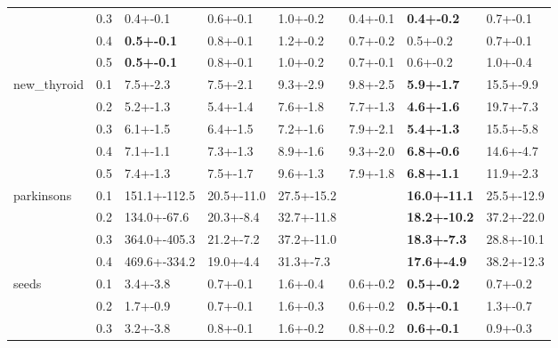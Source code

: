 \begin{tabular}{llllllll}
     & 0.3 &           0.4+-0.1 &                0.6+-0.1 &        1.0+-0.2 &        0.4+-0.1 &        \textbf{0.4+-0.2} &        0.7+-0.1 \\
     & 0.4 &  \textbf{0.5+-0.1} &                0.8+-0.1 &        1.2+-0.2 &        0.7+-0.2 &                 0.5+-0.2 &        0.7+-0.1 \\
     & 0.5 &  \textbf{0.5+-0.1} &                0.8+-0.1 &        1.0+-0.2 &        0.7+-0.1 &                 0.6+-0.2 &        1.0+-0.4 \\
new_thyroid & 0.1 &           7.5+-2.3 &                7.5+-2.1 &        9.3+-2.9 &        9.8+-2.5 &        \textbf{5.9+-1.7} &       15.5+-9.9 \\
     & 0.2 &           5.2+-1.3 &                5.4+-1.4 &        7.6+-1.8 &        7.7+-1.3 &        \textbf{4.6+-1.6} &       19.7+-7.3 \\
     & 0.3 &           6.1+-1.5 &                6.4+-1.5 &        7.2+-1.6 &        7.9+-2.1 &        \textbf{5.4+-1.3} &       15.5+-5.8 \\
     & 0.4 &           7.1+-1.1 &                7.3+-1.3 &        8.9+-1.6 &        9.3+-2.0 &        \textbf{6.8+-0.6} &       14.6+-4.7 \\
     & 0.5 &           7.4+-1.3 &                7.5+-1.7 &        9.6+-1.3 &        7.9+-1.8 &        \textbf{6.8+-1.1} &       11.9+-2.3 \\
parkinsons & 0.1 &       151.1+-112.5 &              20.5+-11.0 &      27.5+-15.2 &                 &      \textbf{16.0+-11.1} &      25.5+-12.9 \\
     & 0.2 &        134.0+-67.6 &               20.3+-8.4 &      32.7+-11.8 &                 &      \textbf{18.2+-10.2} &      37.2+-22.0 \\
     & 0.3 &       364.0+-405.3 &               21.2+-7.2 &      37.2+-11.0 &                 &       \textbf{18.3+-7.3} &      28.8+-10.1 \\
     & 0.4 &       469.6+-334.2 &               19.0+-4.4 &       31.3+-7.3 &                 &       \textbf{17.6+-4.9} &      38.2+-12.3 \\
seeds & 0.1 &           3.4+-3.8 &                0.7+-0.1 &        1.6+-0.4 &        0.6+-0.2 &        \textbf{0.5+-0.2} &        0.7+-0.2 \\
     & 0.2 &           1.7+-0.9 &                0.7+-0.1 &        1.6+-0.3 &        0.6+-0.2 &        \textbf{0.5+-0.1} &        1.3+-0.7 \\
     & 0.3 &           3.2+-3.8 &                0.8+-0.1 &        1.6+-0.2 &        0.8+-0.2 &        \textbf{0.6+-0.1} &        0.9+-0.3 \\

\end{tabular}
